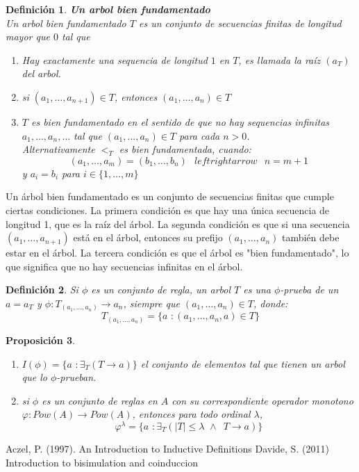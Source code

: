 \documentclass[executivepaper]{article}
\newtheorem{propo}{Proposición}[section]
\newtheorem{defi}[propo]{Definición}
\begin{document}
\begin{defi}\textbf{Un arbol bien fundamentado}\\
    Un arbol bien fundamentado $T$ es un conjunto de secuencias finitas de longitud mayor que $0$ tal que
    \begin{enumerate}
        \item Hay exactamente una sequencia de longitud $1$ en $T$, es llamada la raíz $(a_{T})$ del arbol.
        \item si $(a_1,\ldots,a_{n+1})\in T$, entonces $(a_1,\ldots,a_{n})\in T$
        \item $T$ es bien fundamentado en el sentido de que no hay sequencias infinitas $a_1,\ldots,a_n,\ldots$ tal que $(a_1,\ldots,a_{n})\in T$ para cada $n>0$.\\
        Alternativamente $<_T$ es bien fundamentada, cuando:
        $$(a_1,\ldots,a_{m}) = (b_1,\ldots,b_{n}) \,\,\,\ leftrightarrow \,\,\,\ n = m+1$$
        y $a_i = b_i$ para $i\in\{1,\ldots, m\}$
    \end{enumerate}
\end{defi}
Un árbol bien fundamentado es un conjunto de secuencias finitas que cumple ciertas condiciones. La primera condición es que hay una única secuencia de longitud 1, que es la raíz del árbol. La segunda condición es que si una secuencia $(a_1,\ldots,a_{n+1})$ está en el árbol, entonces su prefijo $(a_1,\ldots,a_n)$ también debe estar en el árbol. La tercera condición es que el árbol es "bien fundamentado", lo que significa que no hay secuencias infinitas en el árbol.

\begin{defi}
    Si $\phi$ es un conjunto de regla, un arbol $T$ es una $\phi$-prueba de un $a = a_T$ y $\phi: T_{(a_1,\ldots,a_{n})}\rightarrow a_n$, siempre que $(a_1,\ldots,a_{n})\in T$, donde:
    $$T_{(a_1,\ldots,a_{n})} = \{a \,\, : (a_1,\ldots,a_{n},a) \in T\}$$
\end{defi}
\begin{propo}
    \begin{enumerate}
        \item $I(\phi) = \{a\,\,:\exists_{T}(T\rightarrow a)\}$ el conjunto de elementos tal que tienen un arbol que lo $\phi$-prueban.
        \item si $\phi$ es un conjunto de reglas en $A$ con su correspondiente operador monotono $\varphi:Pow(A)\rightarrow Pow(A)$, entonces para todo ordinal $\lambda$,
        $$\varphi^{\lambda} = \{a\,\,:\exists_{T}(|T|\leq\lambda\,\,\land\,\,\,T\rightarrow a)\}$$
    \end{enumerate}
\end{propo}

\newpage
\begin{thebibliography}{9}
    Aczel, P. (1997). 
    An Introduction to Inductive Definitions
    Davide, S. (2011)
    Introduction to bisimulation and coinduccion
\end{thebibliography}
\end{document}
